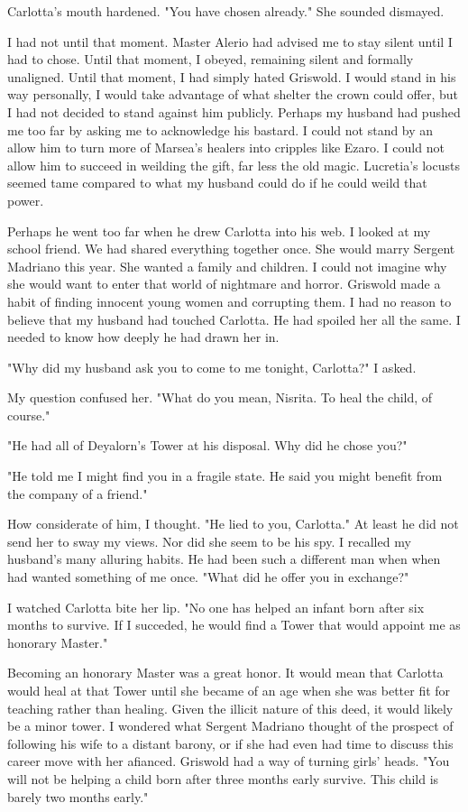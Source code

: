 \documentclass{article}
\begin{document}
Carlotta's mouth hardened. "You have chosen already." She sounded dismayed.

I had not until that moment. Master Alerio had advised me to stay silent until I had to chose. Until that moment, I obeyed, remaining silent and formally unaligned. Until that moment, I had simply hated Griswold. I would stand in his way personally, I would take advantage of what shelter the crown could offer, but I had not decided to stand against him publicly. Perhaps my husband had pushed me too far by asking me to acknowledge his bastard. I could not stand by an allow him to turn more of Marsea's healers into cripples like Ezaro. I could not allow him to succeed in weilding the gift, far less the old magic. Lucretia's locusts seemed tame compared to what my husband could do if he could weild that power. 

Perhaps he went too far when he drew Carlotta into his web. I looked at my school friend. We had shared everything together once. She would marry Sergent Madriano this year. She wanted a family and children. I could not imagine why she would want to enter that world of nightmare and horror. Griswold made a habit of finding innocent young women and corrupting them. I had no reason to believe that my husband had touched Carlotta. He had spoiled her all the same. I needed to know how deeply he had drawn her in.

"Why did my husband ask you to come to me tonight, Carlotta?" I asked.

My question confused her. "What do you mean, Nisrita. To heal the child, of course."

"He had all of Deyalorn's Tower at his disposal. Why did he chose you?"

"He told me I might find you in a fragile state. He said you might benefit from the company of a friend."

How considerate of him, I thought. "He lied to you, Carlotta." At least he did not send her to sway my views. Nor did she seem to be his spy. I recalled my husband's many alluring habits. He had been such a different man when when had wanted something of me once. "What did he offer you in exchange?"

I watched Carlotta bite her lip. "No one has helped an infant born after six months to survive. If I succeded, he would find a Tower that would appoint me as honorary Master."

Becoming an honorary Master was a great honor. It would mean that Carlotta would heal at that Tower until she became of an age when she was better fit for teaching rather than healing. Given the illicit nature of this deed, it would likely be a minor tower. I wondered what Sergent Madriano thought of the prospect of following his wife to a distant barony, or if she had even had time to discuss this career move with her afianced. Griswold had a way of turning girls' heads. "You will not be helping a child born after three months early survive. This child is barely two months early."
\end{document}
